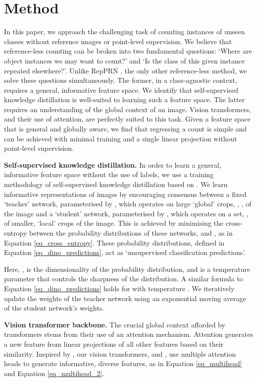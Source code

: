\documentclass[letterpaper, 11pt]{IEEEtran}
\begin{document}
\section{Method}
\label{method}
In this paper, we approach the challenging task of counting instances of unseen classes without reference images or point-level supervision. 
We believe that reference-less counting can be broken into two fundamental questions: `Where are object instances we may want to count?' and `Is the class of this given instance repeated elsewhere?'. 
Unlike RepPRN \cite{ranjan2022exemplar}, the only other reference-less method, we solve these questions simultaneously.
The former, in a class-agnostic context, requires a general, informative feature space. We identify that self-supervised knowledge distillation is well-suited to learning such a feature space. The latter requires an understanding of the global context of an image. Vision transformers, and their use of attention, are perfectly suited to this task.
Given a feature space that is general and globally aware, we find that regressing a count is simple and can be achieved with minimal training and a single linear projection without point-level supervision.

\textbf{Self-supervised knowledge distillation.}
In order to learn a general, informative feature space without the use of labels, we use a training methodology of self-supervised knowledge distillation based on \citet{caron2021DINO}. We learn informative representations of images by encouraging consensus between a fixed `teacher' network,  parameterised by ,  which operates on large `global' crops, , ,  of the image and a `student' network,  parameterised by , which operates on a set, , of smaller, `local' crops of the image.
This is achieved by minimising the cross-entropy between the probability distributions of these networks,  and , as in Equation \ref{eq_cross_entropy}.
These probability distributions, defined in Equation \ref{eq_dino_predictions}, act as `unsupervised classification predictions'. 



\noindent 
Here, ,  is the dimensionality of the probability distribution, and
 is a temperature parameter that controls the sharpness of the distribution. 
A similar formula to Equation \ref{eq_dino_predictions} holds for  with temperature .
We iteratively update the weights of the teacher network using an exponential moving average of the student network's weights.

\textbf{Vision transformer backbone.}
The crucial global context afforded by transformers stems from their use of an attention mechanism. Attention generates a new feature from linear projections of all other features based on their similarity.
Inspired by \citet{vaswani2017attention}, our vision transformers,  and , use multiple attention heads to generate informative, diverse features, as in Equation \ref{eq_multihead} and Equation \ref{eq_multihead_2}.
\end{document}
